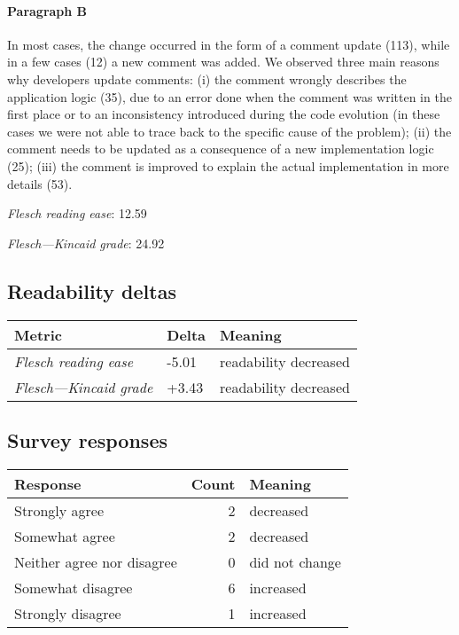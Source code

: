\paragraph{Paragraph B}
In most cases, the change occurred in the form of a comment update (113), while in a few cases (12) a new comment was added. We observed three main reasons why developers update comments: (i) the comment wrongly describes the application logic (35), due to an error done when the comment was written in the first place or to an inconsistency introduced during the code evolution (in these cases we were not able to trace back to the specific cause of the problem); (ii) the comment needs to be updated as a consequence of a new implementation logic (25); (iii) the comment is improved to explain the actual implementation in more details (53).\par\medskip
\emph{Flesch reading ease}: 12.59\par
\emph{Flesch---Kincaid grade}: 24.92

\subsection{Readability deltas}

\begin{tabular}{lll}
\toprule
               \textbf{Metric} & \textbf{Delta} &       \textbf{Meaning} \\
\midrule
    \emph{Flesch reading ease} &          -5.01 &  readability decreased \\
 \emph{Flesch---Kincaid grade} &          +3.43 &  readability decreased \\
\bottomrule
\end{tabular}

\subsection{Survey responses}
\begin{tabular}{lrl}
\toprule
          \textbf{Response} &  \textbf{Count} & \textbf{Meaning} \\
\midrule
             Strongly agree &               2 &        decreased \\
             Somewhat agree &               2 &        decreased \\
 Neither agree nor disagree &               0 &   did not change \\
          Somewhat disagree &               6 &        increased \\
          Strongly disagree &               1 &        increased \\
\bottomrule
\end{tabular}

